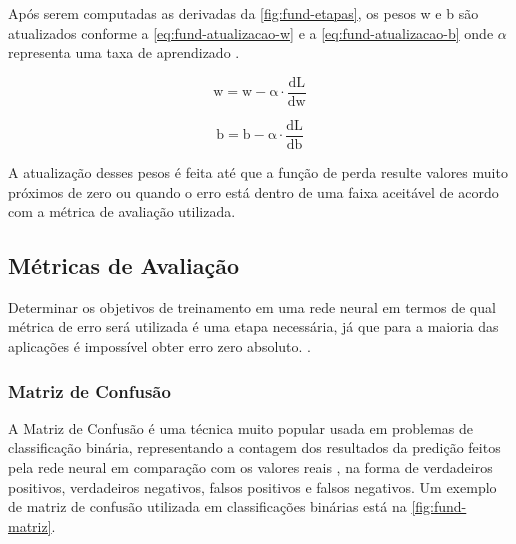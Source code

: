Após serem computadas as derivadas da \autoref{fig:fund-etapas}, os pesos w e b são atualizados conforme a \autoref{eq:fund-atualizacao-w} e a \autoref{eq:fund-atualizacao-b} onde $\alpha$ representa uma taxa de aprendizado \cite{ref:Ng}.

\begin{equation} \label{eq:fund-atualizacao-w}
  \mathrm{
    w = w - \alpha \cdot \frac{dL}{dw}
  }
\end{equation}

\begin{equation} \label{eq:fund-atualizacao-b}
  \mathrm{
    b = b - \alpha \cdot \frac{dL}{db}
  }
\end{equation}

A atualização desses pesos é feita até que a função de perda resulte valores muito próximos de zero ou quando o erro está dentro de uma faixa aceitável de acordo com a métrica de avaliação utilizada.



\subsection{Métricas de Avaliação} \label{cap:fund-ia-metricas}
Determinar os objetivos de treinamento em uma rede neural em termos de qual métrica de erro será utilizada é uma etapa necessária, já que para a maioria das aplicações é impossível obter erro zero absoluto. \cite{ref:Goodfellow-Bengio-Courville}.

\subsubsection{Matriz de Confusão} \label{cap:fund-ia-metricas-matriz}
A Matriz de Confusão é uma técnica muito popular usada em problemas de classificação binária, representando a contagem dos resultados da predição feitos pela rede neural em comparação com os valores reais \cite{ref:Batarseh-Yang}, na forma de verdadeiros positivos, verdadeiros negativos, falsos positivos e falsos negativos. Um exemplo de matriz de confusão utilizada em classificações binárias está na \autoref{fig:fund-matriz}.


